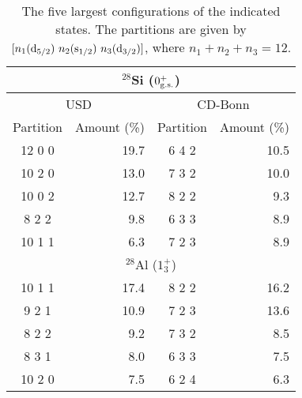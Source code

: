 \begin{table}
\caption{The five largest configurations of the indicated states. The partitions
are given by $[n_1({\rm d}_{5/2})\ n_2({\rm s}_{1/2})\ n_3({\rm d}_{3/2})]$,
where $n_1+n_2+n_3=12$.}
\begin{tabular}{crcr}
\multicolumn{4}{c}{$^{28}$Si ($0^+_{\rm g.s.}$)} \\
\hline
\multicolumn{2}{c}{USD} & \multicolumn{2}{c}{CD-Bonn} \\
Partition & Amount (\%) & Partition & Amount (\%)\\
\hline
12 0 0 & 19.7 & 6 4 2 & 10.5 \\
10 2 0 & 13.0 & 7 3 2 & 10.0 \\
10 0 2 & 12.7 & 8 2 2 & 9.3 \\
8 2 2  & 9.8 & 6 3 3 & 8.9 \\
10 1 1 & 6.3 & 7 2 3 & 8.9 \\
\hline
\multicolumn{4}{c}{$^{28}$Al ($1^+_3$)} \\
\hline
10 1 1 & 17.4 & 8 2 2 & 16.2 \\
9 2 1 & 10.9 & 7 2 3 & 13.6 \\
8 2 2 & 9.2 & 7 3 2 & 8.5 \\
8 3 1 & 8.0 & 6 3 3 & 7.5 \\
10 2 0 & 7.5 & 6 2 4 & 6.3 \\
\hline
\end{tabular}
\label{occ}
\end{table}



